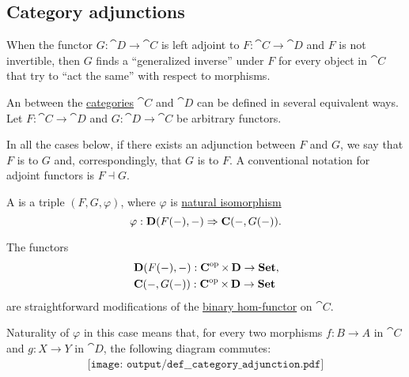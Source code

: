 \subsection{Category adjunctions}\label{subsec:category_adjunctions}

\begin{remark}\label{rem:adjoint_functors}\cite{StanfordPlato:category_theory}
  When the functor \( G: \cat{D} \to \cat{C} \) is left adjoint to \( F: \cat{C} \to \cat{D} \) and \( F \) is not invertible, then \( G \) finds a \enquote{generalized inverse} under \( F \) for every object in \( \cat{C} \) that try to \enquote{act the same} with respect to morphisms.
\end{remark}

\begin{definition}\label{def:category_adjunction}
  An  between the \hyperref[def:category]{categories} \( \cat{C} \) and \( \cat{D} \) can be defined in several equivalent ways. Let \( F: \cat{C} \to \cat{D} \) and \( G: \cat{D} \to \cat{C} \) be arbitrary functors.

  In all the cases below, if there exists an adjunction between \( F \) and \( G \), we say that \( F \) is  to \( G \) and, correspondingly, that \( G \) is  to \( F \). A conventional notation for adjoint functors is \( F \dashv G \).

  \begin{thmenum}
     A  is a triple \( (F, G, \varphi) \), where \( \varphi \) is \hyperref[thm:natural_isomorphism]{natural isomorphism}
    \begin{equation}\label{eq:def:category_adjunction/hom}
      \varphi: \cat{D}(F(\anon*), \anon*) \Rightarrow \cat{C}(\anon*, G(\anon*)).
    \end{equation}

    The functors
    \begin{align*}
      &\cat{D}(F(\anon*), \anon*): \cat{C}^{\opcat} \times \cat{D} \to \cat{Set}, \\
      &\cat{C}(\anon*, G(\anon*)): \cat{C}^{\opcat} \times \cat{D} \to \cat{Set}
    \end{align*}
    are straightforward modifications of the \hyperref[eq:def:hom_functor/binary]{binary hom-functor} on \( \cat{C} \).

    Naturality of \( \varphi \) in this case means that, for every two morphisms \( f: B \to A \) in \( \cat{C} \) and \( g: X \to Y \) in \( \cat{D} \), the following diagram commutes:
    \begin{equation}\label{eq:def:category_adjunction/varphi_nat}
      \begin{aligned}
        \texttt{[image: output/def\_\_category\_adjunction.pdf]}
      \end{aligned}
    \end{equation}


\end{thmenum}
\end{definition}
